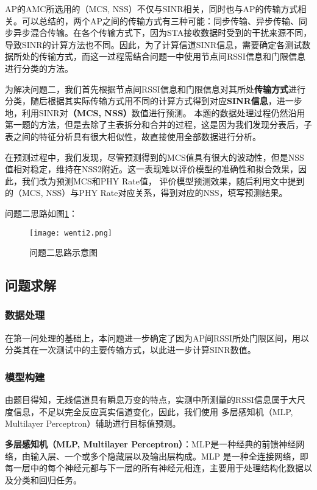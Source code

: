\documentclass[bwprint]{gmcmthesis}
\begin{document}
AP的AMC所选用的（MCS, NSS）不仅与SINR相关，同时也与AP的传输方式相关。可以总结的，两个AP之间的传输方式有三种可能：同步传输、异步传输、同步异步混合传输。在各个传输方式下，因为STA接收数据时受到的干扰来源不同，导致SINR的计算方法也不同。因此，为了计算信道SINR信息，需要确定各测试数据所处的传输方式，而这一过程需结合问题一中使用节点间RSSI信息和门限信息进行分类的方法。

为解决问题二，我们首先根据节点间RSSI信息和门限信息对其所处\textbf{传输方式}进行分类，随后根据其实际传输方式用不同的计算方式得到对应\textbf{SINR信息}，进一步地，利用SINR对\textbf{（MCS, NSS）}数值进行预测。
本题的数据处理过程仍然沿用第一题的方法，但是去除了主表拆分和合并的过程，这是因为我们发现分表后，子表之间的特征分析具有很大相似性，故直接使用全部数据进行分析。

在预测过程中，我们发现，尽管预测得到的MCS值具有很大的波动性，但是NSS值相对稳定，维持在NSS2附近。这一表现难以评价模型的准确性和拟合效果，因此，我们改为预测MCS和PHY Rate值，
评价模型预测效果，随后利用文中提到的（MCS, NSS）与PHY Rate对应关系，得到对应的NSS，填写预测结果。

问题二思路如图\ref{pho:wenti2}：
\begin{figure}[!htbp]
    \centering
    \texttt{[image: wenti2.png]}
    \caption{\centering 问题二思路示意图}
    \label{pho:wenti2}
\end{figure}

\subsection{问题求解}
\subsubsection{数据处理}
在第一问处理的基础上，本问题进一步确定了因为AP间RSSI所处门限区间，用以分类其在一次测试中的主要传输方式，以此进一步计算SINR数值。

\subsubsection{模型构建}
由题目得知，无线信道具有瞬息万变的特点，实测中所测量的RSSI信息属于大尺度信息，不足以完全反应真实信道变化，因此，我们使用
多层感知机（MLP, Multilayer Perceptron）辅助进行目标值预测。

\textbf{多层感知机（MLP, Multilayer Perceptron）}：MLP是一种经典的前馈神经网络，由输入层、一个或多个隐藏层以及输出层构成。MLP 是一种全连接网络，即每一层中的每个神经元都与下一层的所有神经元相连，主要用于处理结构化数据以及分类和回归任务。
\end{document}
